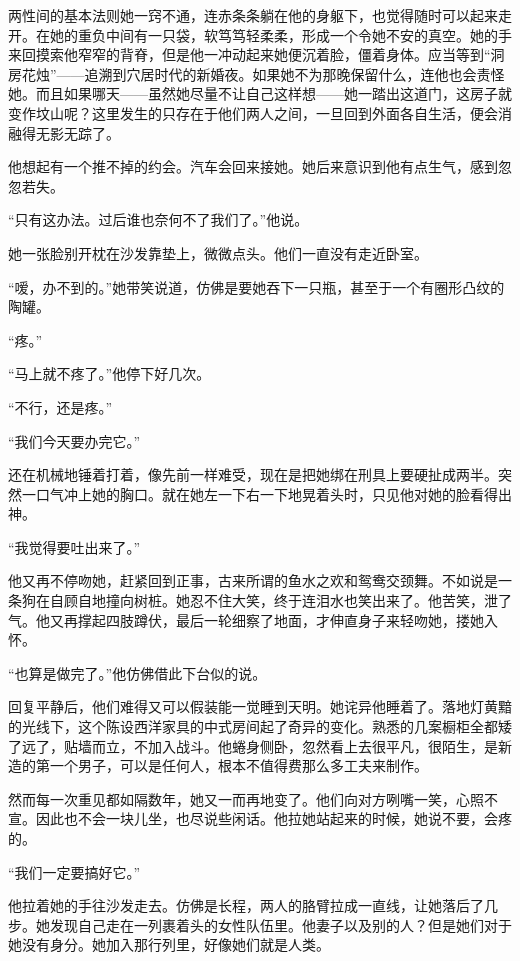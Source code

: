 \par 两性间的基本法则她一窍不通，连赤条条躺在他的身躯下，也觉得随时可以起来走开。在她的重负中间有一只袋，软笃笃轻柔柔，形成一个令她不安的真空。她的手来回摸索他窄窄的背脊，但是他一冲动起来她便沉着脸，僵着身体。应当等到“洞房花烛”——追溯到穴居时代的新婚夜。如果她不为那晚保留什么，连他也会责怪她。而且如果哪天——虽然她尽量不让自己这样想——她一踏出这道门，这房子就变作坟山呢？这里发生的只存在于他们两人之间，一旦回到外面各自生活，便会消融得无影无踪了。
\par 他想起有一个推不掉的约会。汽车会回来接她。她后来意识到他有点生气，感到忽忽若失。
\par “只有这办法。过后谁也奈何不了我们了。”他说。
\par 她一张脸别开枕在沙发靠垫上，微微点头。他们一直没有走近卧室。
\par “嗳，办不到的。”她带笑说道，仿佛是要她吞下一只瓶，甚至于一个有圈形凸纹的陶罐。
\par “疼。”
\par “马上就不疼了。”他停下好几次。
\par “不行，还是疼。”
\par “我们今天要办完它。”
\par 还在机械地锤着打着，像先前一样难受，现在是把她绑在刑具上要硬扯成两半。突然一口气冲上她的胸口。就在她左一下右一下地晃着头时，只见他对她的脸看得出神。
\par “我觉得要吐出来了。”
\par 他又再不停吻她，赶紧回到正事，古来所谓的鱼水之欢和鸳鸯交颈舞。不如说是一条狗在自顾自地撞向树桩。她忍不住大笑，终于连泪水也笑出来了。他苦笑，泄了气。他又再撑起四肢蹲伏，最后一轮细察了地面，才伸直身子来轻吻她，搂她入怀。
\par “也算是做完了。”他仿佛借此下台似的说。
\par 回复平静后，他们难得又可以假装能一觉睡到天明。她诧异他睡着了。落地灯黄黯的光线下，这个陈设西洋家具的中式房间起了奇异的变化。熟悉的几案橱柜全都矮了远了，贴墙而立，不加入战斗。他蜷身侧卧，忽然看上去很平凡，很陌生，是新造的第一个男子，可以是任何人，根本不值得费那么多工夫来制作。
\par 然而每一次重见都如隔数年，她又一而再地变了。他们向对方咧嘴一笑，心照不宣。因此也不会一块儿坐，也尽说些闲话。他拉她站起来的时候，她说不要，会疼的。
\par “我们一定要搞好它。”
\par 他拉着她的手往沙发走去。仿佛是长程，两人的胳臂拉成一直线，让她落后了几步。她发现自己走在一列裹着头的女性队伍里。他妻子以及别的人？但是她们对于她没有身分。她加入那行列里，好像她们就是人类。



